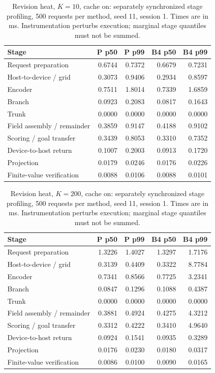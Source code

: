 \begin{table}[ht]
\centering\small
\caption{Revision heat, $K=10$, cache on: separately synchronized stage profiling, 500 requests per method, seed 11, session 1. Times are in ms. Instrumentation perturbs execution; marginal stage quantiles must not be summed.}\label{tab:e2_profile_heat_10_on}
\begin{tabular}{@{}lrrrr@{}}\toprule
Stage & P p50 & P p99 & B4 p50 & B4 p99\\\midrule
Request preparation & 0.6744 & 0.7372 & 0.6679 & 0.7231\\
Host-to-device / grid & 0.3073 & 0.9406 & 0.2934 & 0.8597\\
Encoder & 0.7511 & 1.8014 & 0.7339 & 1.6859\\
Branch & 0.0923 & 0.2083 & 0.0817 & 0.1643\\
Trunk & 0.0000 & 0.0000 & 0.0000 & 0.0000\\
Field assembly / remainder & 0.3859 & 0.9147 & 0.4188 & 0.9102\\
Scoring / goal transfer & 0.3439 & 0.8053 & 0.3310 & 0.7352\\
Device-to-host return & 0.1007 & 0.2003 & 0.0913 & 0.1720\\
Projection & 0.0179 & 0.0246 & 0.0176 & 0.0226\\
Finite-value verification & 0.0088 & 0.0106 & 0.0088 & 0.0101\\
\bottomrule\end{tabular}
\end{table}

\begin{table}[ht]
\centering\small
\caption{Revision heat, $K=200$, cache on: separately synchronized stage profiling, 500 requests per method, seed 11, session 1. Times are in ms. Instrumentation perturbs execution; marginal stage quantiles must not be summed.}\label{tab:e2_profile_heat_200_on}
\begin{tabular}{@{}lrrrr@{}}\toprule
Stage & P p50 & P p99 & B4 p50 & B4 p99\\\midrule
Request preparation & 1.3226 & 1.4027 & 1.3297 & 1.7176\\
Host-to-device / grid & 0.3139 & 0.4409 & 0.3322 & 8.7784\\
Encoder & 0.7341 & 0.8566 & 0.7725 & 3.2341\\
Branch & 0.0847 & 0.1296 & 0.1088 & 0.4387\\
Trunk & 0.0000 & 0.0000 & 0.0000 & 0.0000\\
Field assembly / remainder & 0.3881 & 0.4924 & 0.4275 & 4.3212\\
Scoring / goal transfer & 0.3312 & 0.4222 & 0.3410 & 4.9640\\
Device-to-host return & 0.0924 & 0.1541 & 0.0935 & 0.3289\\
Projection & 0.0176 & 0.0230 & 0.0180 & 0.0317\\
Finite-value verification & 0.0086 & 0.0100 & 0.0090 & 0.0165\\
\bottomrule\end{tabular}
\end{table}
